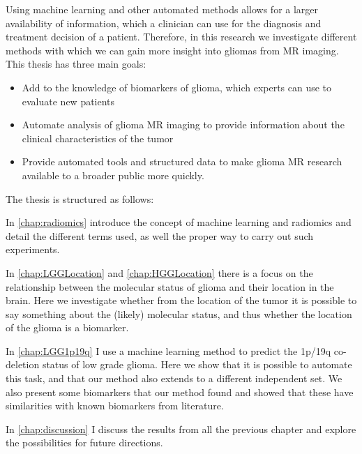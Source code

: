 Using machine learning and other automated methods allows for a larger availability of information, which a clinician can use for the diagnosis and treatment decision of a patient.
Therefore, in this research we investigate different methods with which we can gain more insight into gliomas from MR imaging. This thesis has three main goals:
\begin{itemize}
\item Add to the knowledge of biomarkers of glioma, which experts can use to evaluate new patients
\item Automate analysis of glioma MR imaging to provide information about the clinical characteristics of the tumor
\item Provide automated tools and structured data to make glioma MR research available to a broader public more quickly.
\end{itemize}

The thesis is structured as follows:

In \cref{chap:radiomics} introduce the concept of machine learning and radiomics and detail the different terms used, as well the proper way to carry out such experiments.

In \cref{chap:LGGLocation} and \cref{chap:HGGLocation} there is a focus on the relationship between the molecular status of glioma and their location in the brain.
Here we investigate whether from the location of the tumor it is possible to say something about the (likely) molecular status, and thus whether the location of the glioma is a biomarker.

In \cref{chap:LGG1p19q} I use a machine learning method to predict the 1p/19q co-deletion status of low grade glioma.
Here we show that it is possible to automate this task, and that our method also extends to a different independent set.
We also present some biomarkers that our method found and showed that these have similarities with known biomarkers from literature.

In \cref{chap:discussion} I discuss the results from all the previous chapter and explore the possibilities for future directions.
